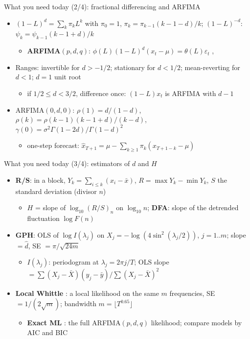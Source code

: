 \begin{frame}{What you need today (2/4): fractional differencing and ARFIMA}
\itemsize{\small}
\begin{itemize}
    \item $(1-L)^d = \sum_k\pi_kL^k$ with $\pi_0 = 1$, $\pi_k = \pi_{k-1}(k-1-d)/k$; $(1-L)^{-d}$: $\psi_k = \psi_{k-1}(k-1+d)/k$
    \begin{itemize}
        \item \textbf{ARFIMA}$(p,d,q)$: $\phi(L)(1-L)^d(x_t - \mu) = \theta(L)\varepsilon_t$ , 
    \end{itemize}
    \item Ranges: invertible for $d > -1/2$; stationary for $d < 1/2$; mean-reverting for $d < 1$; $d = 1$ unit root
    \begin{itemize}
        \item if $1/2 \le d < 3/2$, difference once: $(1-L)x_t$ is ARFIMA with $d - 1$
    \end{itemize}
    \item ARFIMA$(0,d,0)$: $\rho(1) = d/(1-d)$, $\rho(k) = \rho(k-1)(k-1+d)/(k-d)$, $\gamma(0) = \sigma^2\Gamma(1-2d)/\Gamma(1-d)^2$
    \begin{itemize}
        \item one-step forecast: $\hat x_{T+1} = \mu - \sum_{k\ge1}\pi_k(x_{T+1-k} - \mu)$
    \end{itemize}
\end{itemize}
\end{frame}

\begin{frame}{What you need today (3/4): estimators of $d$ and $H$}
\itemsize{\small}
\begin{itemize}
    \item \textbf{R/S}: in a block, $Y_k = \sum_{i\le k}(x_i - \bar x)$, $R = \max Y_k - \min Y_k$, $S$ the standard deviation (divisor $n$)
    \begin{itemize}
        \item $H$ = slope of $\log_{10}(R/S)_n$ on $\log_{10}n$; \textbf{DFA}: slope of the detrended fluctuation $\log F(n)$
    \end{itemize}
    \item \textbf{GPH}: OLS of $\log I(\lambda_j)$ on $X_j = -\log(4\sin^2(\lambda_j/2))$, $j = 1..m$; slope $= \hat d$, SE $= \pi/\sqrt{24m}$
    \begin{itemize}
        \item $I(\lambda_j)$: periodogram at $\lambda_j = 2\pi j/T$; OLS slope $= \sum(X_j - \bar X)(y_j - \bar y)/\sum(X_j - \bar X)^2$
    \end{itemize}
    \item \textbf{Local Whittle} : a local likelihood on the same $m$ frequencies, SE $= 1/(2\sqrt m)$; bandwidth $m = \lfloor T^{0.65}\rfloor$
    \begin{itemize}
        \item \textbf{Exact ML} : the full ARFIMA$(p,d,q)$ likelihood; compare models by AIC and BIC
    \end{itemize}
\end{itemize}
\end{frame}

